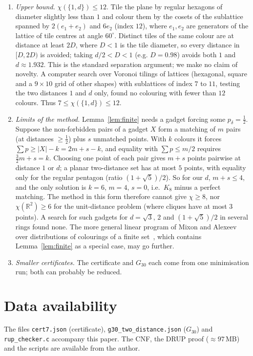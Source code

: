 \documentclass[11pt,a4paper]{amsart}
\theoremstyle{remark}
\begin{document}
\begin{enumerate}
\item \emph{Upper bound.} $\chi(\{1,d\})\le12$. Tile the plane by regular hexagons of diameter slightly less than $1$ and colour them by the cosets of the sublattice spanned by $2(e_1+e_2)$ and $6e_2$ (index $12$), where $e_1,e_2$ are generators of the lattice of tile centres at angle $60^\circ$. Distinct tiles of the same colour are at distance at least $2D$, where $D<1$ is the tile diameter, so every distance in $[D,2D)$ is avoided; taking $d/2<D<1$ (e.g. $D=0.98$) avoids both $1$ and $d\approx1.932$. This is the standard separation argument; we make no claim of novelty. A computer search over Voronoi tilings of lattices (hexagonal, square and a $9\times10$ grid of other shapes) with sublattices of index $7$ to $11$, testing the two distances $1$ and $d$ only, found no colouring with fewer than $12$ colours. Thus $7\le\chi(\{1,d\})\le12$.
\item \emph{Limits of the method.} Lemma~\ref{lem:finite} needs a gadget forcing some $p_\delta=\tfrac12$. Suppose the non-forbidden pairs of a gadget $X$ form a matching of $m$ pairs (at distances $\ge\tfrac12$) plus $s$ unmatched points. With $k$ colours it forces $\sum p\ge |X|-k=2m+s-k$, and equality with $\sum p\le m/2$ requires $\tfrac32m+s=k$. Choosing one point of each pair gives $m+s$ points pairwise at distance $1$ or $d$; a planar two-distance set has at most $5$ points, with equality only for the regular pentagon (ratio $(1+\sqrt5)/2$). So for our $d$, $m+s\le4$, and the only solution is $k=6$, $m=4$, $s=0$, i.e.\ $K_8$ minus a perfect matching. The method in this form therefore cannot give $\chi\ge8$, nor $\chi(\mathbb R^2)\ge6$ for the unit-distance problem (where cliques have at most $3$ points). A search for such gadgets for $d=\sqrt3$, $2$ and $(1+\sqrt5)/2$ in several rings found none. The more general linear program of Mixon and Alexeev over distributions of colourings of a finite set~\cite{PM12,Ts26}, which contains Lemma~\ref{lem:finite} as a special case, may go further.
\item \emph{Smaller certificates.} The certificate and $G_{30}$ each come from one minimisation run; both can probably be reduced.
\end{enumerate}

\section*{Data availability}
The files \texttt{cert7.json} (certificate), \texttt{g30\_two\_distance.json} ($G_{30}$) and \texttt{rup\_checker.c} accompany this paper. The CNF, the DRUP proof ($\approx 97$\,MB) and the scripts are available from the author.
\end{document}
